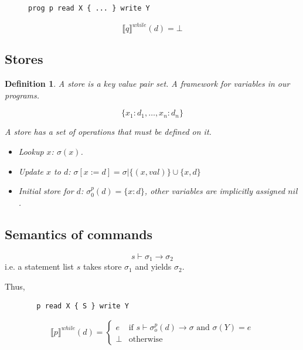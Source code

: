 \documentclass[a4paper, final]{article}
\newtheorem{definition}{Definition}
\begin{document}
\begin{figure}[H]
	\begin{lstlisting}[frame=single]
prog p read X { ... } write Y
\end{lstlisting}
\end{figure}

\begin{figure}[H]
	\begin{equation}
		\llbracket q \rrbracket^{while}(d)=\bot
	\end{equation}
\end{figure}

\subsection{Stores}
\begin{definition}
	A store is a key value pair set. A framework for variables in our programs.

	$$\{x_1:d_1,\ldots,x_n:d_n\}$$

	A store has a set of operations that must be defined on it.
	\begin{itemize}
		\item Lookup $x$: $\sigma(x)$.
		\item Update $x$ to $d$: $\sigma[x:=d]=\sigma | \{(x,val)\}\cup\{x,d\}$
		\item Initial store for $d$: $\sigma_0^p(d)=\{x:d\}$, other variables are implicitly assigned $nil$.
	\end{itemize}
\end{definition}

\subsection{Semantics of commands}
$$s\vdash\sigma_1\to\sigma_2$$
i.e. a statement list $s$ takes store $\sigma_1$ and yields $\sigma_2$.

Thus,

\begin{figure}[H]
	\begin{lstlisting}
  p read X { S } write Y
  \end{lstlisting}
	\begin{equation}
		\llbracket p \rrbracket^{while}(d)=
		\begin{cases}
			e    & \textrm{if }s\vdash\sigma_o^p(d)\to\sigma \textrm{ and } \sigma(Y)=e \\
			\bot & \textrm{otherwise}
		\end{cases}
	\end{equation}
\end{figure}
\end{document}

